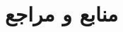 \documentclass[xcolor=dvipsnames, professionalfonts, aspectratio=169, 11pt]{beamer}
\begin{document}
\section{منابع و مراجع}
\begin{frame}
    \begin{latin}
        \scriptsize
        
    \end{latin}

\end{frame}
\end{document}
